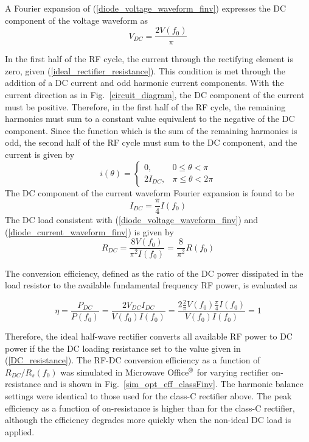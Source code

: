 A Fourier expansion of (\ref{diode_voltage_waveform_finv}) expresses the DC component of the voltage waveform as
\begin{equation}\label{DC_diode_voltage}
    V_{DC} = \frac{2V(f_0)}{\pi}
\end{equation}

In the first half of the RF cycle, the current through the rectifying element is zero, given (\ref{ideal_rectifier_resistance}). This condition is met through the addition of a DC current and odd harmonic current components. With the current direction as in Fig.~\ref{circuit_diagram}, the DC component of the current must be positive.  Therefore, in the first half of the RF cycle, the remaining harmonics must sum to a constant value equivalent to the negative of the DC component.  Since the function which is the sum of the remaining harmonics is odd, the second half of the RF cycle must sum to the DC component, and the current is given by
\begin{equation}\label{diode_current_waveform_finv}
i(\theta) =
\begin{cases}
    0, & 0 \leq \theta < \pi\\
    2I_{DC}, & \pi \leq \theta < 2\pi
\end{cases}
\end{equation}
The DC component of the current waveform Fourier expansion is found to be
\begin{equation}\label{DC_diode_current}
    I_{DC} = \frac{\pi}{4}I(f_0)
\end{equation}
The DC load consistent with (\ref{diode_voltage_waveform_finv}) and (\ref{diode_current_waveform_finv}) is given by
\begin{equation}\label{DC_resistance}
    R_{DC} = \frac{8V(f_0)}{\pi^2I(f_0)} = \frac{8}{\pi^2}R(f_0)
\end{equation}

The conversion efficiency, defined as the ratio of the DC power dissipated in the load resistor to the available fundamental frequency RF power, is evaluated as

\begin{equation}\label{eff_finv}
    \eta = \frac{P_{DC}}{P(f_0)} = \frac{2V_{DC}I_{DC}}{V(f_0)I(f_0)} = \frac{2\frac{2}{\pi}V(f_0)\frac{\pi}{4}I(f_0)}{V(f_0)I(f_0)} = 1
\end{equation}

Therefore, the ideal half-wave rectifier converts all available RF power to DC power if the the DC loading resistance set to the value given in (\ref{DC_resistance}). The RF-DC conversion efficiency as a function of $R_{DC} / R_s(f_0)$ was simulated in Microwave Office$\textsuperscript{\textregistered}$ for varying rectifier on-resistance and is shown in Fig.~\ref{sim_opt_eff_classFinv}. The harmonic balance settings were identical to those used for the class-C rectifier above. The peak efficiency as a function of on-resistance is higher than for the class-C rectifier, although the efficiency degrades more quickly when the non-ideal DC load is applied.

